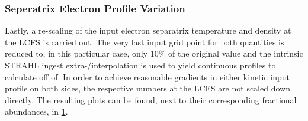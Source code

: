             \subsubsection*{Seperatrix Electron Profile Variation}%
%
                \begin{figure}[t]%
                    \centering%
                    \begin{minipage}[b]{0.48\textwidth}%
                        \centering%
                    \end{minipage}%
                    \hfill%
                    \begin{minipage}[b]{0.48\textwidth}%
                        \centering%
                    \end{minipage}%
                    \label{fig:nete_abund_82_90}%
                \end{figure}%
%
                Lastly, a re-scaling of the input electron separatrix temperature and density at the LCFS is carried out. The very last input grid point for both quantities is reduced to, in this particular case, only 10\% of the original value and the intrinsic STRAHL ingest extra-/interpolation is used to yield continuous profiles to calculate off of. In order to achieve reasonable gradients in either kinetic input profile on both sides, the respective numbers at the LCFS are not scaled down directly. The resulting plots can be found, next to their corresponding fractional abundances, in \cref{fig:nete_abund_82_90}.\\%
